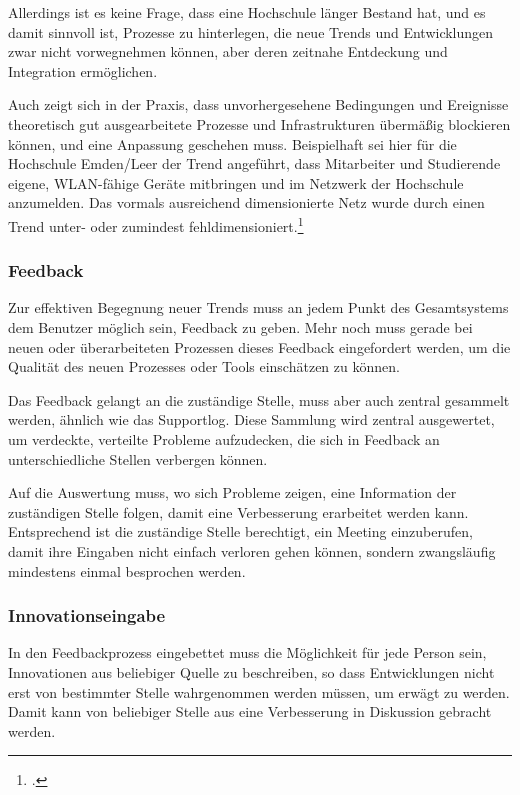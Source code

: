 Allerdings ist es keine Frage, dass eine Hochschule länger Bestand hat, und es damit 
sinnvoll ist, Prozesse zu hinterlegen, die neue Trends und Entwicklungen zwar nicht 
vorwegnehmen können, aber deren zeitnahe Entdeckung und Integration ermöglichen.

Auch zeigt sich in der Praxis, dass unvorhergesehene Bedingungen und Ereignisse 
theoretisch gut ausgearbeitete Prozesse und Infrastrukturen übermäßig blockieren können, 
und eine Anpassung geschehen muss. Beispielhaft sei hier für die Hochschule Emden/Leer 
der Trend angeführt, dass Mitarbeiter und Studierende eigene, WLAN-fähige Geräte 
mitbringen und im Netzwerk der Hochschule anzumelden. Das vormals ausreichend 
dimensionierte Netz wurde durch einen Trend unter- oder zumindest 
fehldimensioniert.\footcite{gunter_muller_interview}

\subsubsection{Feedback}
\label{subsubsection_feedback}
Zur effektiven Begegnung neuer Trends muss an jedem Punkt des Gesamtsystems dem 
Benutzer möglich sein, Feedback zu geben. Mehr noch muss gerade bei neuen oder 
überarbeiteten Prozessen dieses Feedback eingefordert werden, um die Qualität des neuen 
Prozesses oder Tools einschätzen zu können.

Das Feedback gelangt an die zuständige Stelle, muss aber auch zentral gesammelt werden, 
ähnlich wie das Supportlog. Diese Sammlung wird zentral ausgewertet, um verdeckte, 
verteilte Probleme aufzudecken, die sich in Feedback an unterschiedliche Stellen verbergen 
können.

Auf die Auswertung muss, wo sich Probleme zeigen, eine Information der zuständigen Stelle 
folgen, damit eine Verbesserung erarbeitet werden kann. Entsprechend ist die zuständige 
Stelle berechtigt, ein Meeting einzuberufen, damit ihre Eingaben nicht einfach verloren gehen 
können, sondern zwangsläufig mindestens einmal besprochen werden.

\subsubsection{Innovationseingabe}
In den Feedbackprozess eingebettet muss die Möglichkeit für jede Person sein, Innovationen 
aus beliebiger Quelle zu beschreiben, so dass Entwicklungen nicht erst von bestimmter 
Stelle wahrgenommen werden müssen, um erwägt zu werden. Damit kann von beliebiger 
Stelle aus eine Verbesserung in Diskussion gebracht werden.


